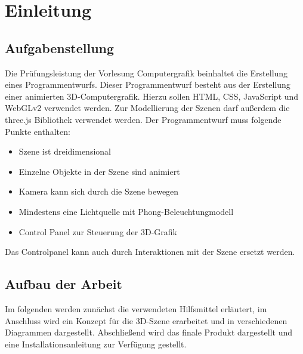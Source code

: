\section{Einleitung}
\subsection{Aufgabenstellung}
Die Prüfungsleistung der Vorlesung Computergrafik beinhaltet die Erstellung eines Programmentwurfs.
\newline
Dieser Programmentwurf besteht aus der Erstellung einer animierten 3D-Computergrafik.
Hierzu sollen HTML, CSS, JavaScript und WebGLv2 verwendet werden. Zur Modellierung der Szenen darf außerdem die three.js Bibliothek verwendet werden.
Der Programmentwurf muss folgende Punkte enthalten:
\begin{itemize}
\item Szene ist dreidimensional
\item Einzelne Objekte in der Szene sind animiert
\item Kamera kann sich durch die Szene bewegen
\item Mindestens eine Lichtquelle mit Phong-Beleuchtungmodell
\item Control Panel zur Steuerung der 3D-Grafik
\end{itemize}
Das Controlpanel kann auch durch Interaktionen mit der Szene ersetzt werden.
\subsection{Aufbau der Arbeit}
Im folgenden werden zunächst die verwendeten Hilfsmittel erläutert,
im Anschluss wird ein Konzept für die 3D-Szene erarbeitet und in verschiedenen Diagrammen dargestellt.
Abschließend wird das finale Produkt dargestellt und eine Installationsanleitung zur Verfügung gestellt.
